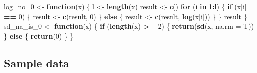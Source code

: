 \documentclass[
]{article}
\newenvironment{Shaded}{\begin{snugshade}}{\end{snugshade}}
\newcommand{\AttributeTok}[1]{\textcolor[rgb]{0.13,0.29,0.53}{#1}}
\newcommand{\ControlFlowTok}[1]{\textcolor[rgb]{0.13,0.29,0.53}{\textbf{#1}}}
\newcommand{\DecValTok}[1]{\textcolor[rgb]{0.00,0.00,0.81}{#1}}
\newcommand{\FunctionTok}[1]{\textcolor[rgb]{0.13,0.29,0.53}{\textbf{#1}}}
\newcommand{\NormalTok}[1]{#1}
\newcommand{\OtherTok}[1]{\textcolor[rgb]{0.56,0.35,0.01}{#1}}
\newcommand{\SpecialCharTok}[1]{\textcolor[rgb]{0.81,0.36,0.00}{\textbf{#1}}}
\begin{document}
\begin{Shaded}
\begin{Highlighting}[]
\NormalTok{log\_no\_0 }\OtherTok{\textless{}{-}} \ControlFlowTok{function}\NormalTok{(x) \{}
\NormalTok{  l }\OtherTok{\textless{}{-}} \FunctionTok{length}\NormalTok{(x)}
\NormalTok{  result }\OtherTok{\textless{}{-}} \FunctionTok{c}\NormalTok{()}
  \ControlFlowTok{for}\NormalTok{ (i }\ControlFlowTok{in} \DecValTok{1}\SpecialCharTok{:}\NormalTok{l) \{}
    \ControlFlowTok{if}\NormalTok{ (x[i] }\SpecialCharTok{==} \DecValTok{0}\NormalTok{) \{}
\NormalTok{      result }\OtherTok{\textless{}{-}} \FunctionTok{c}\NormalTok{(result, }\DecValTok{0}\NormalTok{)}
\NormalTok{    \} }\ControlFlowTok{else}\NormalTok{ \{}
\NormalTok{      result }\OtherTok{\textless{}{-}} \FunctionTok{c}\NormalTok{(result, }\FunctionTok{log}\NormalTok{(x[i]))}
\NormalTok{    \}}
\NormalTok{  \}}
\NormalTok{  result}
\NormalTok{\}}
\NormalTok{sd\_na\_is\_0 }\OtherTok{\textless{}{-}} \ControlFlowTok{function}\NormalTok{(x) \{}
  \ControlFlowTok{if}\NormalTok{ (}\FunctionTok{length}\NormalTok{(x) }\SpecialCharTok{\textgreater{}=} \DecValTok{2}\NormalTok{) \{}
    \FunctionTok{return}\NormalTok{(}\FunctionTok{sd}\NormalTok{(x, }\AttributeTok{na.rm =}\NormalTok{ T))}
\NormalTok{  \} }\ControlFlowTok{else}\NormalTok{ \{}
    \FunctionTok{return}\NormalTok{(}\DecValTok{0}\NormalTok{)}
\NormalTok{  \}}
\NormalTok{\}}
\end{Highlighting}
\end{Shaded}

\subsection{Sample data}\label{sample-data}
\end{document}
